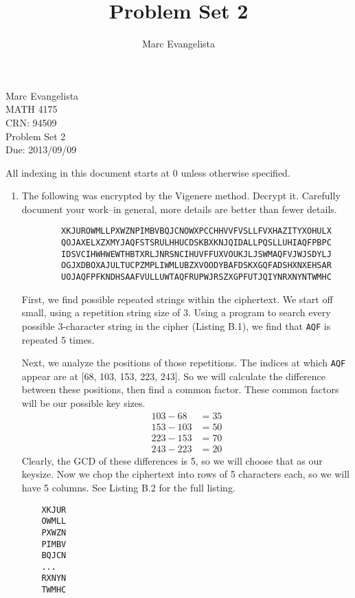 \documentclass[10pt,letterpaper]{report}
\author{Marc Evangelista}
\title{Problem Set 2}
\begin{document}
\begin{flushright}
Marc Evangelista \\
MATH 4175 \\ 
CRN: 94509 \\
Problem Set 2 \\
Due: 2013/09/09
\end{flushright}
	All indexing in this document starts at 0 unless otherwise specified.
\begin{enumerate}
	\item The following was encrypted by the Vigenere method. Decrypt it. Carefully document your work–in general, more details are better than fewer details.
	
		\begin{verbatim}
		XKJUROWMLLPXWZNPIMBVBQJCNOWXPCCHHVVFVSLLFVXHAZITYXOHULX 
		QOJAXELXZXMYJAQFSTSRULHHUCDSKBXKNJQIDALLPQSLLUHIAQFPBPC
		IDSVCIHWHWEWTHBTXRLJNRSNCIHUVFFUXVOUKJLJSWMAQFVJWJSDYLJ
		OGJXDBOXAJULTUCPZMPLIWMLUBZXVOODYBAFDSKXGQFADSHXNXEHSAR
		UOJAQFPFKNDHSAAFVULLUWTAQFRUPWJRSZXGPFUTJQIYNRXNYNTWMHC
		\end{verbatim}

	First, we find possible repeated strings within the ciphertext. We start off small, 
	using a repetition string size of 3. Using a program to search every possible 
	3-character string in the cipher (Listing B.1), we find that \verb|AQF| is repeated 5 times.
	\par
	Next, we analyze the positions of those repetitions. The indices at which \verb|AQF|
	appear are at [68, 103, 153, 223, 243]. So we will calculate the difference between
	these positions, then find a common factor. These common factors will be our possible
	key sizes.
	\begin{align*}
			103 - 68 &= 35 \\
			153 - 103 &= 50 \\
			223 - 153 &= 70 \\
			243 - 223 &= 20		
	\end{align*}
	Clearly, the GCD of these differences is 5, so we will choose that as our keysize.
	Now we chop the ciphertext into rows of 5 characters each, so we will have 5 columns.
	See Listing B.2 for the full listing.
	
	\begin{verbatim}
	XKJUR
	OWMLL
	PXWZN
	PIMBV
	BQJCN
	...
	RXNYN
	TWMHC
	\end{verbatim}
	

\end{enumerate}
\end{document}
